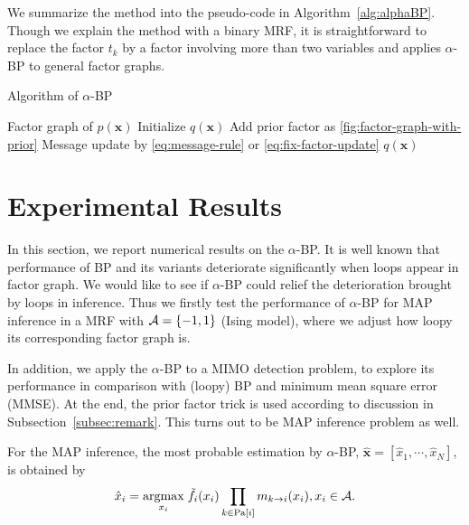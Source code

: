 \documentclass[conference]{IEEEtran}
\begin{document}
We summarize the method into the pseudo-code in Algorithm~\autoref{alg:alphaBP}. Though we explain the method with a binary MRF, it is straightforward to replace the factor $t_k$ by a factor involving more than two variables and applies $\alpha$-BP to general factor graphs.
\begin{algorithm}
  \caption{Algorithm of $\alpha$-BP}\label{alg:alphaBP}
  \begin{algorithmic}[1]
    \renewcommand{\algorithmicrequire}{\textbf{Input:}}
    \renewcommand{\algorithmicensure}{\textbf{Output:}}
    \REQUIRE Factor graph of $p(\bm{x})$
    \STATE Initialize $q(\bm{x})$
    \STATE Add prior factor as \autoref{fig:factor-graph-with-prior}
    \ENDIF
    \STATE Message update by \autoref{eq:message-rule} or \autoref{eq:fix-factor-update}
    \ENDFOR
    \ENDWHILE
    \RETURN $q(\bm{x})$ 
  \end{algorithmic} 
\end{algorithm}

\section{Experimental Results}
In this section, we report numerical results on the $\alpha$-BP. It is well known that performance of BP and its variants deteriorate significantly when loops appear in factor graph. We would like to see if $\alpha$-BP could relief the deterioration brought by loops in inference. Thus we firstly test the performance of $\alpha$-BP for MAP inference in a MRF with $\mathcal{A}=\{-1,1\}$ (Ising model), where we adjust how loopy its corresponding factor graph is.

In addition, we apply the $\alpha$-BP to a MIMO detection problem, to explore its performance in comparison with (loopy) BP and minimum mean square error (MMSE). At the end, the prior factor trick is used according to discussion in Subsection~\ref{subsec:remark}. This turns out to be MAP inference problem as well.

For the MAP inference, the most probable estimation by $\alpha$-BP, $\hat{\bm{x}}=[\hat{x}_1, \cdots, \hat{x}_N]$, is obtained by
\begin{align}
  \hat{x}_{i} = \underset{x_i}{\operatorname{argmax}}\;\tilde{f}_i(x_i) \prod_{k\in \text{Pa}[i]} m_{k\rightarrow i}(x_i), x_i \in \mathcal{A}.
\end{align}
\end{document}
